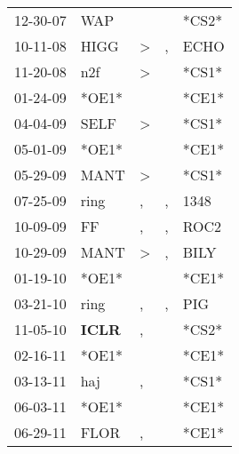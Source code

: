 \begin{supertabular}{p{0.07\textwidth}p{0.06\textwidth}p{0.02\textwidth}p{0.02\textwidth}p{0.06\textwidth}}
 12-30-07\textsuperscript{} &            WAP\textsuperscript{} &               &    &                   *CS2* \\
 10-11-08\textsuperscript{} &           HIGG\textsuperscript{} &  \textgreater &  , &  ECHO\textsuperscript{} \\
 11-20-08\textsuperscript{} &            n2f\textsuperscript{} &  \textgreater &    &                   *CS1* \\
 01-24-09\textsuperscript{} &                            *OE1* &               &    &                   *CE1* \\
 04-04-09\textsuperscript{} &           SELF\textsuperscript{} &  \textgreater &    &                   *CS1* \\
 05-01-09\textsuperscript{} &                            *OE1* &               &    &                   *CE1* \\
 05-29-09\textsuperscript{} &           MANT\textsuperscript{} &  \textgreater &    &                   *CS1* \\
 07-25-09\textsuperscript{} &           ring\textsuperscript{} &             , &  , &  1348\textsuperscript{} \\
 10-09-09\textsuperscript{} &             FF\textsuperscript{} &             , &  , &  ROC2\textsuperscript{} \\
 10-29-09\textsuperscript{} &           MANT\textsuperscript{} &  \textgreater &  , &  BILY\textsuperscript{} \\
 01-19-10\textsuperscript{} &                            *OE1* &               &    &                   *CE1* \\
 03-21-10\textsuperscript{} &           ring\textsuperscript{} &             , &  , &   PIG\textsuperscript{} \\
 11-05-10\textsuperscript{} &  \textbf{ICLR\textsuperscript{}} &             , &    &                   *CS2* \\
 02-16-11\textsuperscript{} &                            *OE1* &               &    &                   *CE1* \\
 03-13-11\textsuperscript{} &            haj\textsuperscript{} &             , &    &                   *CS1* \\
 06-03-11\textsuperscript{} &                            *OE1* &               &    &                   *CE1* \\
 06-29-11\textsuperscript{} &           FLOR\textsuperscript{} &             , &    &                   *CE1* \\

\end{supertabular}
